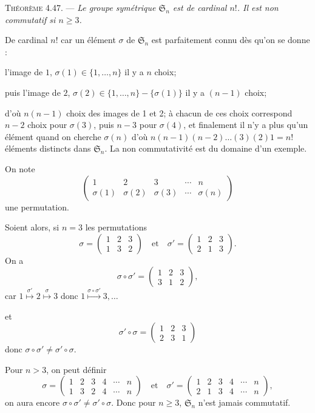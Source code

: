 \medskip\noindent\textsc{Théorème 4.47.} --- \emph{Le groupe symétrique $\mathfrak S_n$ est de cardinal $n!$. Il est non commutatif si $n\ge3$.}

De cardinal $n!$ car un élément $\sigma$ de $\mathfrak S_n$ est parfaitement connu dès qu'on se donne :

l'image de $1$, $\sigma(1)\in\{1,\ldots,n\}$ il y a $n$ choix;

puis l'image de $2$, $\sigma(2)\in\{1,\ldots,n\}-\{\sigma(1)\}$ il y a $(n-1)$ choix;

d'où $n(n-1)$ choix des images de 1 et 2; à chacun de ces choix correspond $n-2$ choix pour $\sigma(3)$, puis $n-3$ pour $\sigma(4)$, et finalement il n'y a plus qu'un élément quand on cherche $\sigma(n)$ d'où $n(n-1)(n-2)\ldots(3)(2)1=n!$ éléments distincts dans $\mathfrak S_n$. La non commutativité est du domaine d'un exemple.

On note
\[
\begin{pmatrix}
1&2&3&\cdots&n\\
\sigma(1)&\sigma(2)&\sigma(3)&\cdots&\sigma(n)
\end{pmatrix}
\]
une permutation.

Soient alors, si $n=3$ les permutations
\[
\sigma=\begin{pmatrix}1&2&3\\1&3&2\end{pmatrix}
\quad\text{et}\quad
\sigma'=\begin{pmatrix}1&2&3\\2&1&3\end{pmatrix}.
\]
On a
\[
\sigma\circ\sigma'=\begin{pmatrix}1&2&3\\3&1&2\end{pmatrix},
\]
car $1\mathrel{\mathop{\longmapsto}\limits^{\sigma'}}2\mathrel{\mathop{\longmapsto}\limits^{\sigma}}3$ donc $1\mathrel{\mathop{\longmapsto}\limits^{\sigma\circ\sigma'}}3,\ldots$

et
\[
\sigma'\circ\sigma=\begin{pmatrix}1&2&3\\2&3&1\end{pmatrix}
\]
donc $\sigma\circ\sigma'\ne\sigma'\circ\sigma$.

Pour $n>3$, on peut définir
\[
\sigma=\begin{pmatrix}1&2&3&4&\cdots&n\\1&3&2&4&\cdots&n\end{pmatrix}
\quad\text{et}\quad
\sigma'=\begin{pmatrix}1&2&3&4&\cdots&n\\2&1&3&4&\cdots&n\end{pmatrix},
\]
on aura encore $\sigma\circ\sigma'\ne\sigma'\circ\sigma$.
Donc pour $n\ge3$, $\mathfrak S_n$ n'est jamais commutatif. \bookend

